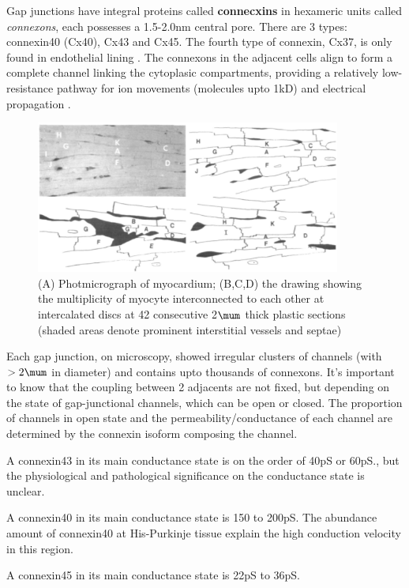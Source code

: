 Gap junctions have integral proteins called {\bf connecxins} in hexameric units
called {\it connexons}, each possesses a 1.5-2.0nm central pore. There are 3
types: connexin40 (Cx40), Cx43 and Cx45. The fourth type of connexin, Cx37, is
only found in endothelial lining \citep{vanVeen2006}. The connexons
in the adjacent cells align to form a complete channel linking the cytoplasic
compartments, providing a relatively low-resistance pathway for ion movements
(molecules upto 1kD) and electrical propagation \citep{imanaga1987, spray1990}.

\begin{figure}[hbt]
  \centerline{\includegraphics[height=5cm,
    angle=0]{./images/micrograph_cardiac.eps}}
  \caption{(A) Photmicrograph of myocardium; (B,C,D) the drawing showing the
  multiplicity of myocyte interconnected to each other at intercalated discs at
  42 consecutive 2$\mum$ thick plastic sections (shaded areas denote prominent
  interstitial vessels and septae)
  \citep{hoyt1989}}
\label{fig:micrograph_cardiac}
\end{figure}

\begin{framed}
Each gap junction, on microscopy, showed irregular clusters of channels (with
$> 2\mum$ in diameter) and contains upto thousands of connexons. It's important
to know that the coupling between 2 adjacents are not fixed, but depending on
the state of gap-junctional channels, which can be open or closed. The
proportion of channels in open state and the permeability/conductance of each
channel are determined by the connexin isoform composing the channel.

A connexin43 in its main conductance state is on the order of 40pS or 60pS., but
the physiological and pathological significance on the conductance state is
unclear.

A connexin40 in its main conductance state is 150 to 200pS. The abundance
amount of connexin40 at His-Purkinje tissue explain the high conduction velocity
in this region.

A connexin45 in its main conductance state is 22pS to 36pS.
\end{framed}

